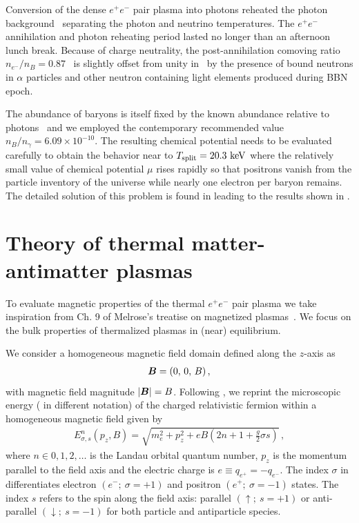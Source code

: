 Conversion of the dense $e^{+}e^{-}$ pair plasma into photons reheated the photon background~\cite{Birrell:2014uka} separating the photon and neutrino temperatures. The $e^{+}e^{-}$ annihilation and photon reheating period lasted no longer than an afternoon lunch break. Because of charge neutrality, the post-annihilation comoving ratio $n_{e^{-}}/n_{B}=0.87$~\cite{Rafelski:2023emw} is slightly offset from unity in~ by the presence of bound neutrons in $\alpha$ particles and other neutron containing light elements produced during BBN epoch.

The abundance of baryons is itself fixed by the known abundance relative to photons~\cite{ParticleDataGroup:2022pth} and we employed the contemporary recommended value $n_B/n_\gamma=6.09\times 10^{-10}$. The resulting chemical potential needs to be evaluated carefully to obtain the behavior near to $T_\mathrm{split}=20.3\text{ keV}$ where the relatively small value of chemical potential $\mu$ rises rapidly so that positrons vanish from the particle inventory of the universe while nearly one electron per baryon remains. The detailed solution of this problem is found in \cite{Fromerth:2012fe,Rafelski:2023emw} leading to the results shown in .

\section{Theory of thermal matter-antimatter plasmas}
\label{sec:theory}
\noindent To evaluate magnetic properties of the thermal $e^{+}e^{-}$ pair plasma we take inspiration from Ch. 9 of Melrose's treatise on magnetized plasmas~\cite{melrose2008quantum}. We focus on the bulk properties of thermalized plasmas in (near) equilibrium.

We consider a homogeneous magnetic field domain defined along the $z$-axis as
\begin{gather}
    \label{homoB:1}
    \boldsymbol{B}=(0,\,0,\,B)\,,
\end{gather}
with magnetic field magnitude $|\boldsymbol{B}|=B$. Following , we reprint the microscopic energy ( in different notation) of the charged relativistic fermion within a homogeneous magnetic field given by
\begin{align}
 \label{cosmokgp}
 E^{n}_{\sigma,s}(p_{z},{B})=\sqrt{m_{e}^{2}+p_{z}^{2}+e{B}\left(2n+1+\frac{g}{2}\sigma s\right)}\,,
\end{align}
where $n\in0,1,2,\ldots$ is the Landau orbital quantum number, $p_{z}$ is the momentum parallel to the field axis and the electric charge is $e\equiv q_{e^{+}}=-q_{e^{-}}$. The index $\sigma$ in  differentiates electron $(e^{-};\ \sigma=+1)$ and positron $(e^{+};\ \sigma=-1)$ states. The index $s$ refers to the spin along the field axis: parallel $(\uparrow;\ s=+1)$ or anti-parallel $(\downarrow;\ s=-1)$ for both particle and antiparticle species.

